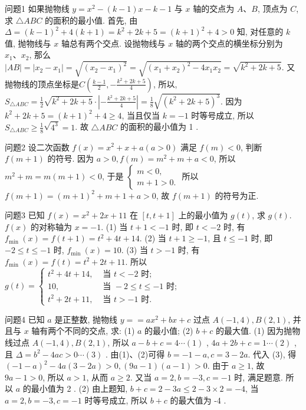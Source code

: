 
问题1 如果抛物线 $y=x^2-(k-1) x-k-1$ 与 $x$ 轴的交点为 $A 、 B$, 顶点为 $C$, 求 $\triangle A B C$ 的面积的最小值.
首先, 由 $\Delta=(k-1)^2+4(k+1)=k^2+2 k+5=(k+1)^2+4>0$ 知, 对任意的 $k$ 值, 抛物线与 $x$ 轴总有两个交点.
设抛物线与 $x$ 轴的两个交点的横坐标分别为 $x_1 、 x_2$, 那么 $|A B|=\left|x_2-x_1\right|=\sqrt{\left(x_2-x_1\right)^2}= \sqrt{\left(x_1+x_2\right)^2-4 x_1 x_2}=\sqrt{k^2+2 k+5}$. 又抛物线的顶点坐标是$C\left(\frac{k-1}{2},-\frac{k^2+2 k+5}{4}\right)$, 所以, $S_{\triangle A B C}=\frac{1}{2} \sqrt{k^2+2 k+5} \cdot\left|-\frac{k^2+2 k+5}{4}\right|= \frac{1}{8} \sqrt{\left(k^2+2 k+5\right)^3}$. 因为 $k^2+2 k+5=(k+1)^2+4 \geqslant 4$, 当且仅当 $k=-1$ 时等号成立, 所以 $S_{\triangle A B C} \geqslant \frac{1}{8} \sqrt{4^3}=1$. 故 $\triangle A B C$ 的面积的最小值为 1 .



问题2 设二次函数 $f(x)=x^2+x+a(a>0)$ 满足 $f(m)<0$, 判断 $f(m+1)$ 的符号.
因为 $a>0, f(m)=m^2+m+a<0$, 所以 $m^2+m=m(m+1)<0$, 于是 $\left\{\begin{array}{l}m<0, \\ m+1>0 .\end{array}\right.$ 所以 $f(m+1)=(m+1)^2+m+1+a>0$, 故 $f(m+1)$ 的符号为正.



问题3 已知 $f(x)=x^2+2 x+11$ 在 $[t, t+1]$ 上的最小值为 $g(t)$, 求 $g(t)$.
$f(x)$ 的对称轴为 $x=-1$. 
(1) 当 $t+1<-1$ 时, 即 $t<-2$ 时, 有 $f_{\text {min }}(x)=f(t+1)=t^2+4 t+14$. 
(2) 当 $t+1 \geqslant-1$, 且 $t \leqslant-1$ 时, 即 $-2 \leqslant t \leqslant-1$ 时, $f_{\text {min }}(x)=10$. 
(3) 当 $t>-1$ 时, 有 $f_{\text {min }}(x)=f(t)= t^2+2 t+11$. 
所以 $g(t)= \begin{cases}t^2+4 t+14, & \text { 当 } t<-2 \text { 时; } \\ 10, & \text { 当 }-2 \leqslant t \leqslant-1 \text { 时; } \\ t^2+2 t+11, & \text { 当 } t>-1 \text { 时.
}\end{cases}$



问题4 已知 $a$ 是正整数, 抛物线 $y==a x^2+b x+c$ 过点 $A(-1,4), B(2,1)$, 并且与 $x$ 轴有两个不同的交点, 求:
(1) $a$ 的最小值;
(2) $b+c$ 的最大值.
(1) 因为抛物线过点 $A(-1,4), B(2,1)$, 所以 $a-b+c=4 \cdots(1)$ , $4 a+ 2 b+c=1 \cdots(2)$ , 且 $\Delta=b^2-4 a c>0 \cdots(3)$ . 由(1)、(2)可得 $b=-1-a, c= 3-2 a$. 代入 (3), 得 $(-1-a)^2-4 a(3-2 a)>0,(9 a-1)(a-1)>0$. 由于 $a \geqslant 1$, 故 $9 a-1>0$, 所以 $a>1$, 从而 $a \geqslant 2$. 又当 $a=2, b=-3, c=-1$ 时, 满足题意.
所以 $a$ 的最小值为 2 . 
(2) 由上题知, $b+c=2-3 a \leqslant 2-3 \times 2=-4$, 当 $a=2, b=-3, c=-1$ 时等号成立, 所以 $b+c$ 的最大值为 -4 .



